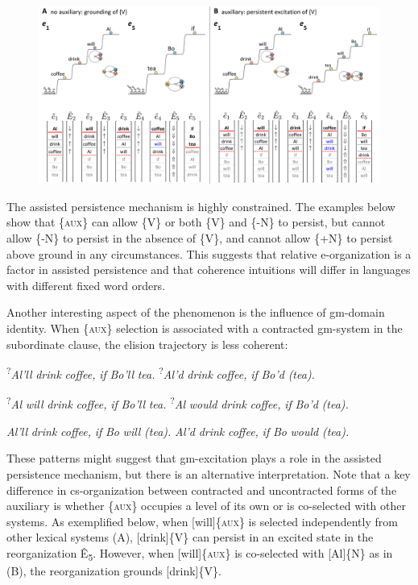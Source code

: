   
\begin{figure}
\includegraphics[width=\textwidth]{figures/Tilsen-img147.png}
\caption{\missingcaption}
\label{fig:}
\end{figure}
 

  The assisted persistence mechanism is highly constrained. The examples below show that \{\textsc{aux}\} can allow \{V\} or both \{V\} and \{-N\} to persist, but cannot allow \{-N\} to persist in the absence of \{V\}, and cannot allow \{+N\} to persist above ground in any circumstances. This suggests that relative e-organization is a factor in assisted persistence and that coherence intuitions will differ in languages with different fixed word orders. 

  Another interesting aspect of the phenomenon is the influence of gm-domain identity. When \{\textsc{aux}\} selection is associated with a contracted gm-system in the subordinate clause, the elision trajectory is less coherent: 

  \textsuperscript{?}\textit{Al’ll} \textit{drink} \textit{coffee,} \textit{if} \textit{Bo’ll} \textit{tea.}      \textsuperscript{?}\textit{Al’d} \textit{drink} \textit{coffee,} \textit{if} \textit{Bo’d} \textit{(tea).}

  \textsuperscript{?}\textit{Al} \textit{will} \textit{drink} \textit{coffee,} \textit{if} \textit{Bo’ll} \textit{tea.}    \textsuperscript{?}\textit{Al} \textit{would} \textit{drink} \textit{coffee,} \textit{if} \textit{Bo’d} \textit{(tea).}

  \textit{Al’ll} \textit{drink} \textit{coffee,} \textit{if} \textit{Bo} \textit{will} \textit{(tea).}    \textit{Al’d} \textit{drink} \textit{coffee,} \textit{if} \textit{Bo} \textit{would} \textit{(tea).}

  These patterns might suggest that gm-excitation plays a role in the assisted persistence mechanism, but there is an alternative interpretation. Note that a key difference in cs-organization between contracted and uncontracted forms of the auxiliary is whether \{\textsc{aux}\} occupies a level of its own or is co-selected with other systems. As exemplified below, when [will]\{\textsc{aux}\} is selected independently from other lexical systems (A), [drink]\{V\} can persist in an excited state in the reorganization Ê\textsubscript{5}. However, when [will]\{\textsc{aux}\} is co-selected with [Al]\{N\} as in (B), the reorganization grounds [drink]\{V\}.

